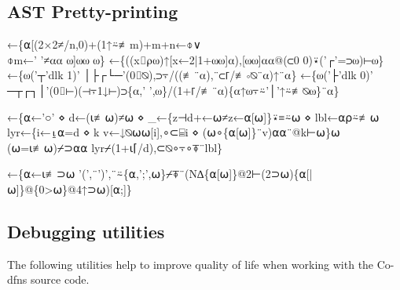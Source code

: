 \documentclass{article}%
\begin{document}
\subsection{AST Pretty-printing}

\nwenddocs{}\endmoddef\nwstartdeflinemarkup{}\nwenddeflinemarkup
{}←\{⍺[(2×2≠/n,0)+(1↑⍨≢m)+m+n←⌽∨\\⌽m←' '≠⍺⍺ ⍵]⍵⍵ ⍵\}
←\{((x⌷⍴⍵)↑[x←2|1+⍵⍵]⍺),[⍵⍵]⍺⍺@(⊂0 0)⍣('┌'=⊃⍵)⊢⍵\}
←\{⍵('┬'dlk 1)' │├┌└─'(0⌷⍉),⊃⍪/((≢¨⍺),¨⊂⌈/≢∘⍉¨⍺)↑¨⍺\}
←\{⍵('├'dlk 0)' ─┬┌┐│'(0⌷⊢)(⊣⍪1↓⊢)⊃\{⍺,' ',⍵\}/(1+⌈/≢¨⍺)\{⍺↑⍵⍪⍨'│'↑⍨≢⍉⍵\}¨⍺\}

←\{⍺←'○' ⋄ d←(⍳≢⍵)≠⍵ ⋄ _←\{z⊣d+←⍵≠z←⍺[⍵]\}⍣≡⍨⍵ ⋄ lbl←⍺⍴⍨≢⍵
        lyr←\{i←⍸⍺=d ⋄ k v←↓⍉⍵⍵[i],∘⊂⌸i ⋄ (⍵∘\{⍺[⍵]\}¨v)⍺⍺¨@k⊢⍵\}⍵
        (⍵=⍳≢⍵)⌿⊃⍺⍺ lyr⌿(1+⍳⌈/d),⊂⍉∘⍪∘⍕¨lbl\}

←\{⍺←⍳≢⊃⍵
        '(',¨')',¨⍨\{⍺,';',⍵\}⌿⍕¨(N∆\{⍺[⍵]\}@2⊢(2⊃⍵)\{⍺[|⍵]\}@\{0>⍵\}@4↑⊃⍵)[⍺;]\}
\eatline
{}\nwendcode{}\nwdocspar
\subsection{Debugging utilities}

The following utilities help to improve quality of life when working
with the Co-dfns source code.
\end{document}
